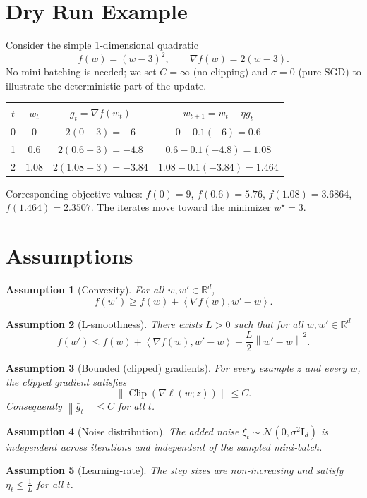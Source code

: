 \documentclass{article}
\newtheorem{assumption}{Assumption}
\newcommand{\R}{\mathbb{R}}
\newcommand{\norm}[1]{\left\|#1\right\|}
\newcommand{\ip}[2]{\left\langle #1,#2\right\rangle}
\newcommand{\grad}{\nabla}
\newcommand{\clip}[1]{\operatorname{Clip}\!\left(#1\right)}
\begin{document}
\section*{Dry Run Example}
Consider the simple 1‑dimensional quadratic
\[
f(w)=(w-3)^2,\qquad\grad f(w)=2(w-3).
\]
No mini‑batching is needed; we set $C=\infty$ (no clipping) and $\sigma=0$ (pure SGD) to illustrate the deterministic part of the update.

\begin{center}
\begin{tabular}{c|c|c|c}
$t$ & $w_t$ & $g_t=\grad f(w_t)$ & $w_{t+1}=w_t-\eta g_t$ \\ \hline
0 & $0$ & $2(0-3)=-6$ & $0-0.1(-6)=0.6$ \\
1 & $0.6$ & $2(0.6-3)=-4.8$ & $0.6-0.1(-4.8)=1.08$ \\
2 & $1.08$ & $2(1.08-3)=-3.84$ & $1.08-0.1(-3.84)=1.464$ \\
\end{tabular}
\end{center}
Corresponding objective values: $f(0)=9$, $f(0.6)=5.76$, $f(1.08)=3.6864$, $f(1.464)=2.3507$. The iterates move toward the minimizer $w^{\star}=3$.

\newpage
\section*{Assumptions}
\begin{assumption}[Convexity]\label{ass:convex}
For all $w,w'\in\R^{d}$,
\[
f(w')\ge f(w)+\ip{\grad f(w)}{w'-w}.
\]
\end{assumption}
\begin{assumption}[L‑smoothness]\label{ass:smooth}
There exists $L>0$ such that for all $w,w'\in\R^{d}$
\[
f(w')\le f(w)+\ip{\grad f(w)}{w'-w}+\frac{L}{2}\norm{w'-w}^{2}.
\]
\end{assumption}
\begin{assumption}[Bounded (clipped) gradients]\label{ass:bddgrad}
For every example $z$ and every $w$, the clipped gradient satisfies
\[
\norm{\clip{\grad\ell(w;z)}}\le C.
\]
Consequently $\norm{\bar g_t}\le C$ for all $t$.
\end{assumption}
\begin{assumption}[Noise distribution]\label{ass:noise}
The added noise $\xi_t\sim\mathcal{N}(0,\sigma^{2}\mathbf{I}_d)$ is independent across iterations and independent of the sampled mini‑batch.
\end{assumption}
\begin{assumption}[Learning‑rate]\label{ass:lr}
The step sizes are non‑increasing and satisfy $\eta_t\le \frac{1}{L}$ for all $t$.
\end{assumption}
\end{document}
